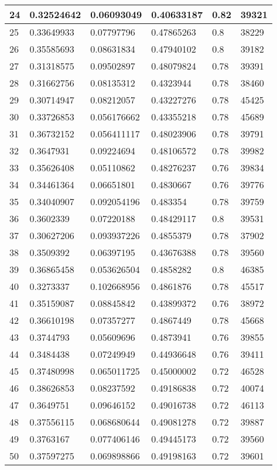 \begin{longtable}{|l|l|l|l|l|l|}
24 & 0.32524642 & 0.06093049 & 0.40633187 & 0.82 & 39321 \\ \hline 
25 & 0.33649933 & 0.07797796 & 0.47865263 & 0.8 & 38229 \\ \hline 
26 & 0.35585693 & 0.08631834 & 0.47940102 & 0.8 & 39182 \\ \hline 
27 & 0.31318575 & 0.09502897 & 0.48079824 & 0.78 & 39391 \\ \hline 
28 & 0.31662756 & 0.08135312 & 0.4323944 & 0.78 & 38460 \\ \hline 
29 & 0.30714947 & 0.08212057 & 0.43227276 & 0.78 & 45425 \\ \hline 
30 & 0.33726853 & 0.056176662 & 0.43355218 & 0.78 & 45689 \\ \hline 
31 & 0.36732152 & 0.056411117 & 0.48023906 & 0.78 & 39791 \\ \hline 
32 & 0.3647931 & 0.09224694 & 0.48106572 & 0.78 & 39982 \\ \hline 
33 & 0.35626408 & 0.05110862 & 0.48276237 & 0.76 & 39834 \\ \hline 
34 & 0.34461364 & 0.06651801 & 0.4830667 & 0.76 & 39776 \\ \hline 
35 & 0.34040907 & 0.092054196 & 0.483354 & 0.78 & 39759 \\ \hline 
36 & 0.3602339 & 0.07220188 & 0.48429117 & 0.8 & 39531 \\ \hline 
37 & 0.30627206 & 0.093937226 & 0.4855379 & 0.78 & 37902 \\ \hline 
38 & 0.3509392 & 0.06397195 & 0.43676388 & 0.78 & 39560 \\ \hline 
39 & 0.36865458 & 0.053626504 & 0.4858282 & 0.8 & 46385 \\ \hline 
40 & 0.3273337 & 0.102668956 & 0.4861876 & 0.78 & 45517 \\ \hline 
41 & 0.35159087 & 0.08845842 & 0.43899372 & 0.76 & 38972 \\ \hline 
42 & 0.36610198 & 0.07357277 & 0.4867449 & 0.78 & 45668 \\ \hline 
43 & 0.3744793 & 0.05609696 & 0.4873941 & 0.76 & 39855 \\ \hline 
44 & 0.3484438 & 0.07249949 & 0.44936648 & 0.76 & 39411 \\ \hline 
45 & 0.37480998 & 0.065011725 & 0.45000002 & 0.72 & 46528 \\ \hline 
46 & 0.38626853 & 0.08237592 & 0.49186838 & 0.72 & 40074 \\ \hline 
47 & 0.3649751 & 0.09646152 & 0.49016738 & 0.72 & 46113 \\ \hline 
48 & 0.37556115 & 0.068680644 & 0.49081278 & 0.72 & 39887 \\ \hline 
49 & 0.3763167 & 0.077406146 & 0.49445173 & 0.72 & 39560 \\ \hline 
50 & 0.37597275 & 0.069898866 & 0.49198163 & 0.72 & 39601 \\ \hline 
\end{longtable}